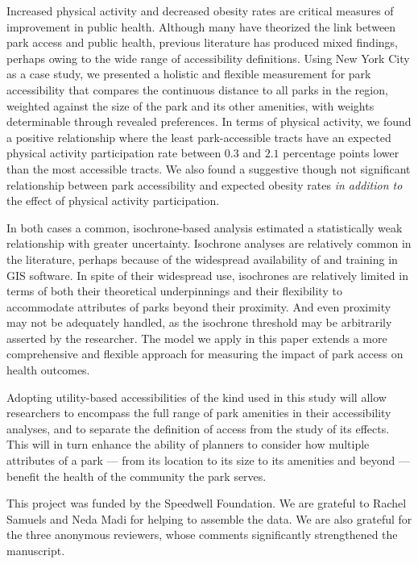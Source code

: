 \documentclass[Crown,sageh.bst]{sagej}
\begin{document}
Increased physical activity and decreased obesity rates are critical
measures of improvement in public health. Although many have theorized
the link between park access and public health, previous literature has
produced mixed findings, perhaps owing to the wide range of
accessibility definitions. Using New York City as a case study, we
presented a holistic and flexible measurement for park accessibility
that compares the continuous distance to all parks in the region,
weighted against the size of the park and its other amenities, with
weights determinable through revealed preferences. In terms of physical
activity, we found a positive relationship where the least
park-accessible tracts have an expected physical activity participation
rate between \(0.3\) and \(2.1\) percentage points lower than the most
accessible tracts. We also found a suggestive though not significant
relationship between park accessibility and expected obesity rates
\emph{in addition to} the effect of physical activity participation.

In both cases a common, isochrone-based analysis estimated a
statistically weak relationship with greater uncertainty. Isochrone
analyses are relatively common in the literature, perhaps because of the
widespread availability of and training in GIS software. In spite of
their widespread use, isochrones are relatively limited in terms of both
their theoretical underpinnings and their flexibility to accommodate
attributes of parks beyond their proximity. And even proximity may not
be adequately handled, as the isochrone threshold may be arbitrarily
asserted by the researcher. The model we apply in this paper extends a
more comprehensive and flexible approach for measuring the impact of
park access on health outcomes.

Adopting utility-based accessibilities of the kind used in this study
will allow researchers to encompass the full range of park amenities in
their accessibility analyses, and to separate the definition of access
from the study of its effects. This will in turn enhance the ability of
planners to consider how multiple attributes of a park --- from its
location to its size to its amenities and beyond --- benefit the health
of the community the park serves.

\begin{acks}
This project was funded by the Speedwell Foundation. We are grateful to Rachel
Samuels and Neda Madi for helping to assemble the data. We are also grateful for
the three anonymous reviewers, whose comments significantly strengthened the 
manuscript.
\end{acks}
\end{document}
